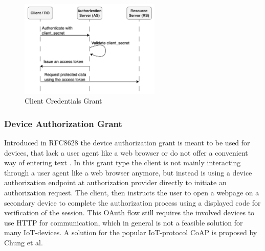 \documentclass[
    fontsize=12pt,
    headings=small,
    parskip=half,           %
    bibliography=totoc,
    numbers=noenddot,       %
    open=any,               %
    ]{scrreprt}
\begin{document}
\begin{figure}[ht]
	\sffamily\footnotesize
	\includegraphics[width=0.6\textwidth]{pic/client_credentials_grant.png}
	\unitlength=0.75mm
	\linethickness{0.4pt}
	\caption{Client Credentials Grant}
	\label{fig:client_credentials_grant}
\end{figure}

\subsubsection{Device Authorization Grant}
Introduced in RFC8628 the device authorization grant is meant to be used for
devices, that lack a user agent like a web browser or do not offer a convenient
way of entering text \cite{denniss2019oauth}. In this grant type the client is
not mainly interacting through a user agent like a web browser anymore, but instead is using a device authorization endpoint at authorization provider directly to initiate an authorization request. The client, then instructs the user to open a webpage on a secondary device to complete the authorization process using a displayed code for verification of the session. This OAuth flow still requires the involved devices to use HTTP for communication, which in general is not a feasible solution for many IoT-devices. A solution for the popular IoT-protocol CoAP is proposed by Chung et al. 
\end{document}
